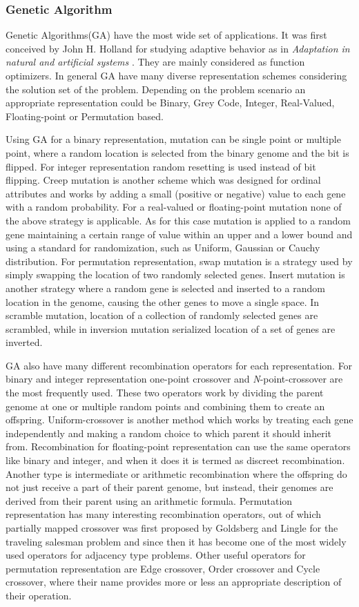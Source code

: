 \documentclass[letterpaper]{article}
\numberwithin{equation}{section}
\begin{document}
\subsubsection{Genetic Algorithm}
Genetic Algorithms(GA) have the most wide set of applications. It was first conceived by John H. Holland for studying adaptive behavior as in \textit{Adaptation in natural and artificial systems} \cite{holland1975}. They are mainly considered as function optimizers. In general GA have many diverse representation schemes considering the solution set of the problem. Depending on the problem scenario an appropriate representation could be Binary, Grey Code, Integer, Real-Valued, Floating-point or Permutation based. 

Using GA for a binary representation, mutation can be single point or multiple point, where a random location is selected from the binary genome and the bit is flipped. For integer representation random resetting is used instead of bit flipping. Creep mutation is another scheme which was designed for ordinal attributes and works by adding a small (positive or negative) value to each gene with a random probability. For a real-valued or floating-point mutation none of the above strategy is applicable. As for this case mutation is applied to a random gene maintaining a certain range of value within an upper and a lower bound and using a standard for randomization, such as Uniform, Gaussian or Cauchy distribution. For permutation representation, swap mutation is a strategy used by simply swapping the location of two randomly selected genes. Insert mutation is another strategy where a random gene is selected and inserted to a random location in the genome, causing the other genes to move a single space. In scramble mutation, location of a collection of randomly selected genes are scrambled, while in inversion mutation serialized location of a set of genes are inverted. 

GA also have many different recombination operators for each representation. For binary and integer representation one-point crossover and \textit{N}-point-crossover are the most frequently used. These two operators work by dividing the parent genome at one or multiple random points and combining them to create an offspring. Uniform-crossover \cite{sywerda1989} is another method which works by treating each gene independently and making a random choice to which parent it should inherit from. Recombination for floating-point representation can use the same operators like binary and integer, and when it does it is termed as discreet recombination. Another type is intermediate or arithmetic recombination where the offspring do not just receive a part of their parent genome, but instead, their genomes are derived from their parent using an arithmetic formula. Permutation representation has many interesting recombination operators, out of which partially mapped crossover was first proposed by Goldsberg and Lingle \cite{goldberg1985} for the traveling salesman problem and since then it has become one of the most widely used operators for adjacency type problems. Other useful operators for permutation representation are Edge crossover, Order crossover and Cycle crossover, where their name provides more or less an appropriate description of their operation.
\end{document}
